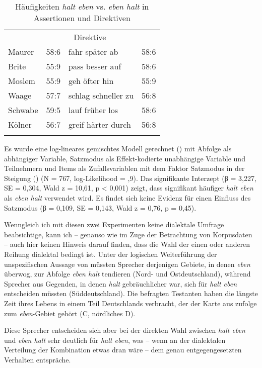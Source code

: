 \begin{table}
        \caption{\label{tab:637}Häufigkeiten \textit{halt eben} vs. \textit{eben halt} in Assertionen und Direktiven}
    \begin{tabular}[t]{lrlr}
    \lsptoprule
    \multicolumn{2}{c}{{Assertionen}} & \multicolumn{2}{c}{{Direktive}}\\\cmidrule(lr){1-2}\cmidrule(lr){3-4}
    Maurer & 58:6 & fahr später ab & 58:6\\
    Brite & 55:9 & pass besser auf & 58:6\\
    Moslem & 55:9 & geh öfter hin & 55:9\\
    Waage & 57:7 & schlag schneller zu & 56:8\\
    Schwabe & 59:5 & lauf früher los & 58:6\\
    Kölner & 56:7 & greif härter durch & 56:8\\
	\lspbottomrule
    \end{tabular}
\end{table}
Es wurde eine log-lineares gemischtes Modell gerechnet (\citealt{Baayen2008}) mit Abfolge als abhängiger Variable, Satzmodus als Effekt-kodierte unabhängige Variable und Teilnehmern und Items als Zufallsvariablen mit dem Faktor Satzmodus in der Steigung (\citealt{Barr2013}) (N = 767, log-Like\-li\-hood = ,9). Das signifikante Interzept (β = 3,227, SE = 0,304, Wald z = 10,61, p < 0,001) zeigt, dass signifikant häufiger \textit{halt eben} als \textit{eben halt} verwendet wird. Es findet sich keine Evidenz für einen Einfluss des Satzmodus (β = 0,109, SE = 0,143, Wald z = 0,76, p = 0,45).

Wenngleich ich mit diesen zwei Experimenten keine dialektale Umfrage beabsichtige, kann ich – genauso wie im Zuge der Betrachtung von Korpusdaten – auch hier keinen Hinweis darauf finden, dass die Wahl der einen oder anderen Reihung dialektal bedingt ist. Unter der logischen Weiterführung der unspezifischen Aussage von \citet{Elspass2005} müssten Sprecher derjenigen Gebiete, in denen \textit{eben} überwog, zur Abfolge \textit{eben halt} tendieren (Nord- und Ostdeutschland), während Sprecher aus Gegenden, in denen \textit{halt} gebräuchlicher war, sich für \textit{halt eben} entscheiden müssten (Süddeutschland). Die befragten Testanten haben die längste Zeit ihres Lebens in einem Teil Deutschlands verbracht, der der Karte aus \citet{Eichhoff1978} zufolge zum \textit{eben}-Gebiet gehört (C, nördliches D).

Diese Sprecher entscheiden sich aber bei der direkten Wahl zwischen \textit{halt eben} und \textit{eben halt} sehr deutlich für \textit{halt eben}, was – wenn an der dialektalen Verteilung der Kombination etwas dran wäre – dem genau entgegengesetzten Verhalten entspräche.\\

